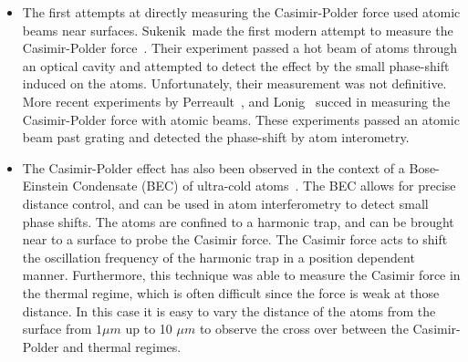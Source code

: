 \begin{itemize}
  \item 
    The first attempts at directly measuring the Casimir-Polder force used atomic beams 
    near surfaces.  
    Sukenik~\etal made the first modern attempt to measure the Casimir-Polder force~\cite{Sukenik1993}.
    Their experiment passed a hot beam of atoms through an optical cavity and attempted to detect
    the effect by the small phase-shift induced on the atoms.  Unfortunately, their measurement 
    was not definitive.
    More recent experiments by Perreault~\etal\cite{Perreault2005}, and Lonig~\etal\cite{Lonij2009} succed in measuring
    the Casimir-Polder force with atomic beams.  These experiments passed an atomic beam past grating and 
    detected the phase-shift by atom interometry.  %

\item 
    The Casimir-Polder effect has also been observed in the context of a Bose-Einstein Condensate (BEC)
    of ultra-cold atoms~\cite{Harber2005,Obrecht2007}.  The BEC allows for precise distance control,
    and can be used in atom interferometry to detect small phase shifts.    
    The atoms are confined to a harmonic trap, and can be brought near to a surface to probe the Casimir
    force.  The Casimir force acts to shift the oscillation frequency of the harmonic trap in a position
    dependent manner.  
    Furthermore, this technique was able to measure the Casimir force in the thermal regime, which
    is often difficult since the force is weak at those distance.  In this case it is easy to 
    vary the distance of the atoms from the surface from $1\mu m$ up to 10 $\mu m$ to observe
    the cross over between the Casimir-Polder and thermal regimes.



\end{itemize}
